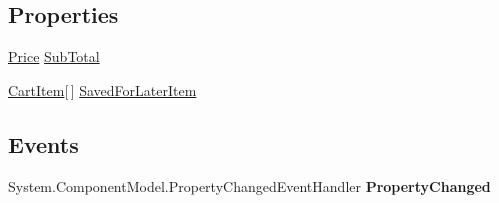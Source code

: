 \subsection*{Properties}
\begin{DoxyCompactItemize}
\item 
\hypertarget{class_price___comparison_1_1amazon_1_1ecs_1_1_saved_for_later_items_afd65154bca2d6d7ce3f9a87e110b7527}{\hyperlink{class_price___comparison_1_1amazon_1_1ecs_1_1_price}{Price} \hyperlink{class_price___comparison_1_1amazon_1_1ecs_1_1_saved_for_later_items_afd65154bca2d6d7ce3f9a87e110b7527}{Sub\-Total}}\label{class_price___comparison_1_1amazon_1_1ecs_1_1_saved_for_later_items_afd65154bca2d6d7ce3f9a87e110b7527}

\begin{DoxyCompactList}\small\item\em \end{DoxyCompactList}\item 
\hypertarget{class_price___comparison_1_1amazon_1_1ecs_1_1_saved_for_later_items_ace64d8b878d6fcf8ead4de62484bec8a}{\hyperlink{class_price___comparison_1_1amazon_1_1ecs_1_1_cart_item}{Cart\-Item}\mbox{[}$\,$\mbox{]} \hyperlink{class_price___comparison_1_1amazon_1_1ecs_1_1_saved_for_later_items_ace64d8b878d6fcf8ead4de62484bec8a}{Saved\-For\-Later\-Item}}\label{class_price___comparison_1_1amazon_1_1ecs_1_1_saved_for_later_items_ace64d8b878d6fcf8ead4de62484bec8a}

\begin{DoxyCompactList}\small\item\em \end{DoxyCompactList}\end{DoxyCompactItemize}
\subsection*{Events}
\begin{DoxyCompactItemize}
\item 
\hypertarget{class_price___comparison_1_1amazon_1_1ecs_1_1_saved_for_later_items_a4857735eed0fa5ec229604239db2a1d4}{System.\-Component\-Model.\-Property\-Changed\-Event\-Handler {\bfseries Property\-Changed}}\label{class_price___comparison_1_1amazon_1_1ecs_1_1_saved_for_later_items_a4857735eed0fa5ec229604239db2a1d4}

\end{DoxyCompactItemize}

